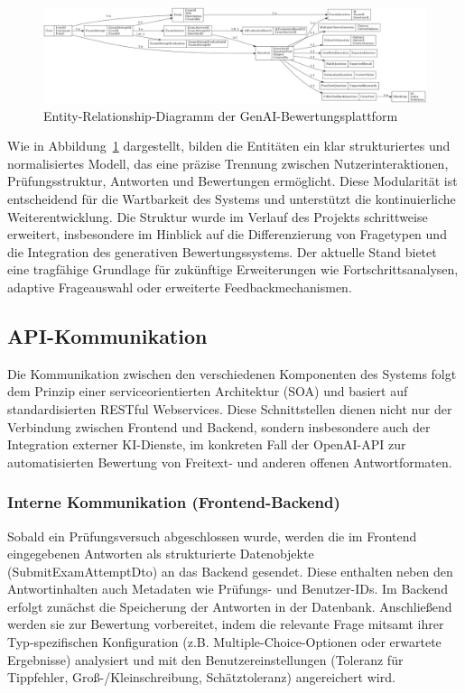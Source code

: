 \documentclass[a4paper,12pt]{article}
\begin{document}
\vspace{1em}
\begin{figure}[h]
\centering
\includegraphics[width=1.1\textwidth]{Bilder/er_diagram_highres.png}
\caption{Entity-Relationship-Diagramm der GenAI-Bewertungsplattform}
\label{fig:erd}
\end{figure}
\vspace{1em}

Wie in Abbildung~\ref{fig:erd} dargestellt, bilden die Entitäten ein klar strukturiertes und normalisiertes Modell, das eine präzise Trennung zwischen Nutzerinteraktionen, Prüfungsstruktur, Antworten und Bewertungen ermöglicht. Diese Modularität ist entscheidend für die Wartbarkeit des Systems und unterstützt die kontinuierliche Weiterentwicklung. Die Struktur wurde im Verlauf des Projekts schrittweise erweitert, insbesondere im Hinblick auf die Differenzierung von Fragetypen und die Integration des generativen Bewertungssystems. Der aktuelle Stand bietet eine tragfähige Grundlage für zukünftige Erweiterungen wie Fortschrittsanalysen, adaptive Frageauswahl oder erweiterte Feedbackmechanismen.

\subsection{API-Kommunikation}
Die Kommunikation zwischen den verschiedenen Komponenten des Systems folgt dem Prinzip einer serviceorientierten Architektur (SOA) und basiert auf standardisierten RESTful Webservices. Diese Schnittstellen dienen nicht nur der Verbindung zwischen Frontend und Backend, sondern insbesondere auch der Integration externer KI-Dienste, im konkreten Fall der OpenAI-API zur automatisierten Bewertung von Freitext- und anderen offenen Antwortformaten.

\subsubsection{Interne Kommunikation (Frontend-Backend)}
Sobald ein Prüfungsversuch abgeschlossen wurde, werden die im Frontend eingegebenen Antworten als strukturierte Datenobjekte (SubmitExamAttemptDto) an das Backend gesendet. Diese enthalten neben den Antwortinhalten auch Metadaten wie Prüfungs- und Benutzer-IDs. Im Backend erfolgt zunächst die Speicherung der Antworten in der Datenbank. Anschließend werden sie zur Bewertung vorbereitet, indem die relevante Frage mitsamt ihrer Typ-spezifischen Konfiguration (z.B. Multiple-Choice-Optionen oder erwartete Ergebnisse) analysiert und mit den Benutzereinstellungen (Toleranz für Tippfehler, Groß-/Kleinschreibung, Schätztoleranz) angereichert wird.
\end{document}
